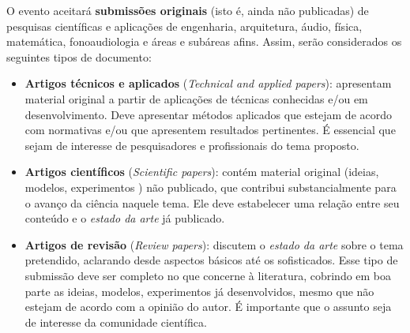 \documentclass[12pt, a4paper, twoside, twocolumn]{article}
\begin{document}
O evento aceitará \textbf{submissões originais} (isto é, ainda não publicadas) de pesquisas científicas e aplicações de engenharia, arquitetura, áudio, física, matemática, fonoaudiologia e áreas e subáreas afins. Assim, serão considerados os seguintes tipos de documento:
%
\begin{itemize}[noitemsep,topsep=0ex] \itemsep=7pt
	\item \textbf{Artigos técnicos e aplicados} (\textit{Technical and applied papers}):
	apresentam material original a partir de aplicações de técnicas conhecidas e/ou em desenvolvimento. Deve apresentar métodos aplicados que estejam de acordo com normativas e/ou que apresentem resultados pertinentes. É essencial que sejam de interesse de pesquisadores e profissionais do tema proposto.
	
	\item \textbf{Artigos científicos} (\textit{Scientific papers}): 
	contém material original (ideias, modelos, experimentos \etc) não publicado, que contribui substancialmente para o avanço da ciência naquele tema. Ele deve estabelecer uma relação entre seu conteúdo e o \textit{estado da arte} já publicado. 

	\item \textbf{Artigos de revisão} (\textit{Review papers}):
	discutem o \textit{estado da arte} sobre o tema pretendido, aclarando desde aspectos básicos até os sofisticados. Esse tipo de submissão deve ser completo no que concerne à literatura, cobrindo em boa parte as ideias, modelos, experimentos \etc já desenvolvidos, mesmo que não estejam de acordo com a opinião do autor. É importante que o assunto seja de interesse da comunidade científica.	
\end{itemize}

\vspace{5pt}
\end{document}
